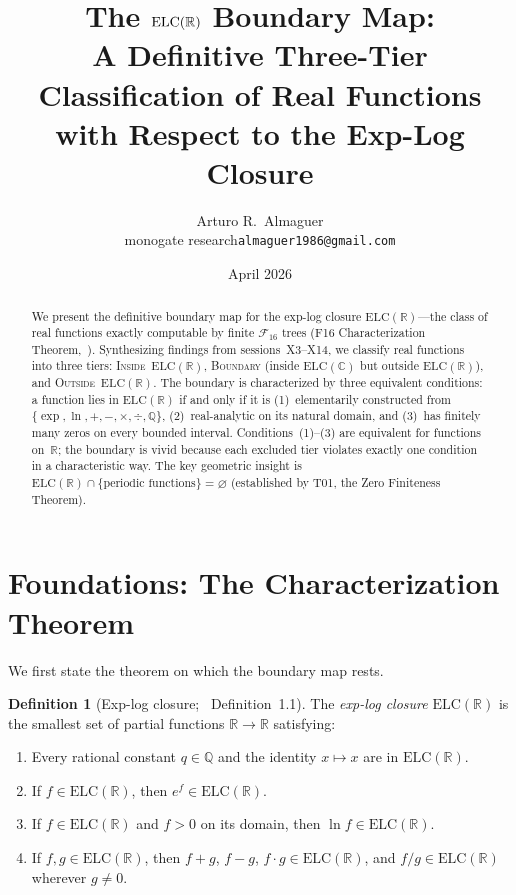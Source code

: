 \documentclass[12pt,a4paper]{article}
\title{The $\ELC$ Boundary Map:\\[4pt]
       A Definitive Three-Tier Classification of Real Functions\\[4pt]
       with Respect to the Exp-Log Closure}
\author{Arturo R.\ Almaguer\\
  \small monogate research\quad\texttt{almaguer1986@gmail.com}}
\date{April 2026 \quad [Session X15]}
\theoremstyle{definition}
\newtheorem{definition}[theorem]{Definition}
\newcommand{\ELC}{\mathrm{ELC}(\mathbb{R})}
\newcommand{\ELCcx}{\mathrm{ELC}(\mathbb{C})}
\newcommand{\R}{\mathbb{R}}
\newcommand{\Q}{\mathbb{Q}}
\newcommand{\F}{\mathcal{F}_{16}}
\begin{document}
\maketitle

\begin{abstract}
We present the definitive boundary map for the exp-log closure
$\ELC$---the class of real functions exactly computable by finite $\F$ trees
(F16 Characterization Theorem,~\cite{F16}).  Synthesizing findings from
sessions~X3--X14, we classify real functions into three tiers:
\textsc{Inside}~$\ELC$,
\textsc{Boundary} (inside $\ELCcx$ but outside $\ELC$),
and \textsc{Outside}~$\ELC$.
The boundary is characterized by three equivalent conditions:
a function lies in $\ELC$ if and only if it is
(1)~elementarily constructed from $\{\exp, \ln, +, -, \times, \div, \Q\}$,
(2)~real-analytic on its natural domain, and
(3)~has finitely many zeros on every bounded interval.
Conditions~(1)--(3) are equivalent for functions on~$\R$;
the boundary is vivid because each excluded tier violates exactly
one condition in a characteristic way.
The key geometric insight is $\ELC \cap \{\text{periodic functions}\} = \varnothing$
(established by T01, the Zero Finiteness Theorem).
\end{abstract}

\tableofcontents
\bigskip

\section{Foundations: The Characterization Theorem}
\label{sec:foundations}

We first state the theorem on which the boundary map rests.

\begin{definition}[Exp-log closure; \cite{F16}~Definition~1.1]
\label{def:elc}
The \emph{exp-log closure} $\ELC$ is the smallest set of partial functions
$\R\to\R$ satisfying:
\begin{enumerate}[label=(\roman*)]
  \item Every rational constant $q\in\Q$ and the identity $x\mapsto x$
        are in $\ELC$.
  \item If $f\in\ELC$, then $e^f\in\ELC$.
  \item If $f\in\ELC$ and $f>0$ on its domain, then $\ln f\in\ELC$.
  \item If $f,g\in\ELC$, then $f+g$, $f-g$, $f\cdot g\in\ELC$, and
        $f/g\in\ELC$ wherever $g\neq 0$.
\end{enumerate}
\end{definition}
\end{document}
